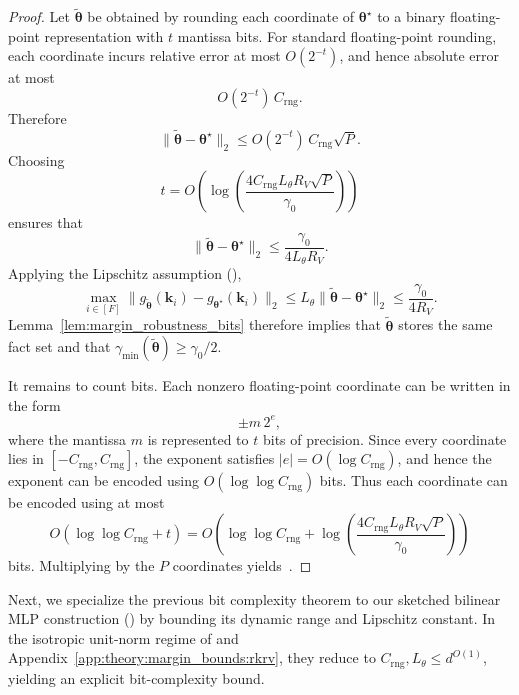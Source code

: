 \begin{proof}
Let $\widetilde{\boldsymbol{\theta}}$ be obtained by rounding each coordinate of
$\boldsymbol{\theta}^\star$ to a binary floating-point representation with $t$ mantissa bits.
For standard floating-point rounding, each coordinate incurs relative error at most
$O(2^{-t})$, and hence absolute error at most
\[
O(2^{-t})\,C_{\mathrm{rng}}.
\]
Therefore
\[
\|\widetilde{\boldsymbol{\theta}}-\boldsymbol{\theta}^\star\|_{2}
\le
O(2^{-t})\,C_{\mathrm{rng}}\sqrt{P}.
\]
Choosing
\[
t
=
O\!\left(
\log\!\left(
\frac{4C_{\mathrm{rng}}L_\theta R_{V}\sqrt{P}}{\gamma_0}
\right)
\right)
\]
ensures that
\[
\|\widetilde{\boldsymbol{\theta}}-\boldsymbol{\theta}^\star\|_{2}
\le
\frac{\gamma_0}{4L_\theta R_V}.
\]
Applying the Lipschitz assumption (),
\[
\max_{i\in[F]}
\|g_{\widetilde{\boldsymbol{\theta}}}(\mathbf{k}_{i})-g_{\boldsymbol{\theta}^\star}(\mathbf{k}_{i})\|_{2}
\le
L_\theta\|\widetilde{\boldsymbol{\theta}}-\boldsymbol{\theta}^\star\|_{2}
\le
\frac{\gamma_0}{4R_V}.
\]
Lemma~\ref{lem:margin_robustness_bits} therefore implies that
$\widetilde{\boldsymbol{\theta}}$ stores the same fact set and that
$\gamma_{\min}(\widetilde{\boldsymbol{\theta}})\ge \gamma_{0}/2$.

It remains to count bits.
Each nonzero floating-point coordinate can be written in the form
\[
\pm m\,2^e,
\]
where the mantissa $m$ is represented to $t$ bits of precision.
Since every coordinate lies in $[-C_{\mathrm{rng}},C_{\mathrm{rng}}]$, the exponent satisfies
$|e|=O(\log C_{\mathrm{rng}})$, and hence the exponent can be encoded using
$O(\log\log C_{\mathrm{rng}})$ bits.
Thus each coordinate can be encoded using at most
\[
O\!\left(
\log\log C_{\mathrm{rng}}
+
t
\right)
=
O\!\left(
\log\log C_{\mathrm{rng}}
+
\log\!\left(
\frac{4C_{\mathrm{rng}}L_\theta R_{V}\sqrt{P}}{\gamma_0}
\right)
\right)
\]
bits.
Multiplying by the \(P\) coordinates yields~.
\end{proof}

Next, we specialize the previous bit complexity theorem to our sketched bilinear MLP construction () by bounding its dynamic range and Lipschitz constant. In the isotropic unit-norm regime of  and Appendix~\ref{app:theory:margin_bounds:rkrv}, they reduce to $C_{\mathrm{rng}},L_\theta\le d^{O(1)}$, yielding an explicit bit-complexity bound.

